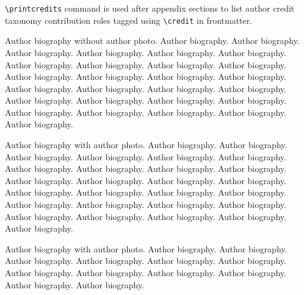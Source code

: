 \documentclass[a4paper,fleqn]{cas-dc}
\begin{document}
\verb+\printcredits+ command is used after appendix sections to list 
author credit taxonomy contribution roles tagged using \verb+\credit+ 
in frontmatter.

\printcredits

%






\bio{}
Author biography without author photo.
Author biography. Author biography. Author biography.
Author biography. Author biography. Author biography.
Author biography. Author biography. Author biography.
Author biography. Author biography. Author biography.
Author biography. Author biography. Author biography.
Author biography. Author biography. Author biography.
Author biography. Author biography. Author biography.
Author biography. Author biography. Author biography.
Author biography. Author biography. Author biography.
\endbio

Author biography with author photo.
Author biography. Author biography. Author biography.
Author biography. Author biography. Author biography.
Author biography. Author biography. Author biography.
Author biography. Author biography. Author biography.
Author biography. Author biography. Author biography.
Author biography. Author biography. Author biography.
Author biography. Author biography. Author biography.
Author biography. Author biography. Author biography.
Author biography. Author biography. Author biography.
\endbio

Author biography with author photo.
Author biography. Author biography. Author biography.
Author biography. Author biography. Author biography.
Author biography. Author biography. Author biography.
Author biography. Author biography. Author biography.
\endbio
\end{document}
